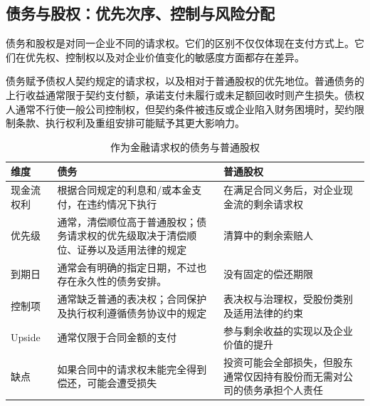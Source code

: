 \subsection{债务与股权：优先次序、控制与风险分配}

债务和股权是对同一企业不同的请求权。它们的区别不仅仅体现在支付方式上。它们在优先权、控制权以及对企业价值变化的敏感度方面都存在差异。

债务赋予债权人契约规定的请求权，以及相对于普通股权的优先地位。普通债务的上行收益通常限于契约支付额，承诺支付未履行或未足额回收时则产生损失。债权人通常不行使一般公司控制权，但契约条件被违反或企业陷入财务困境时，契约限制条款、执行权利及重组安排可能赋予其更大影响力。



\begin{table}[htbp]
\centering

\caption{作为金融请求权的债务与普通股权}
\label{tab:ch9-debt-equity-claims}

\begin{tabularx}{\textwidth}{@{}p{3.0cm}Y Y@{}}

\toprule

\textbf{维度}
& \textbf{债务}
& \textbf{普通股权} \\

\midrule

现金流权利
& 根据合同规定的利息和/或本金支付，在违约情况下执行
& 在满足合同义务后，对企业现金流的剩余请求权 \\

优先级&通常，清偿顺位高于普通股权；债务请求权的优先级取决于清偿顺位、证券以及适用法律的规定&清算中的剩余索赔人\\

到期日  
& 通常会有明确的指定日期，不过也存在永久性的债务安排。  
& 没有固定的偿还期限  
\\

控制项  
&通常缺乏普通的表决权；合同保护及执行权利遵循债务协议中的规定  
& 表决权与治理权，受股份类别及适用法律的约束  
\\

Upside  
& 通常仅限于合同金额的支付  
& 参与剩余收益的实现以及企业价值的提升  
\\

缺点
& 如果合同中的请求权未能完全得到偿还，可能会遭受损失
& 投资可能会全部损失，但股东通常仅因持有股份而无需对公司的债务承担个人责任 \\

\bottomrule

\end{tabularx}

\end{table}

